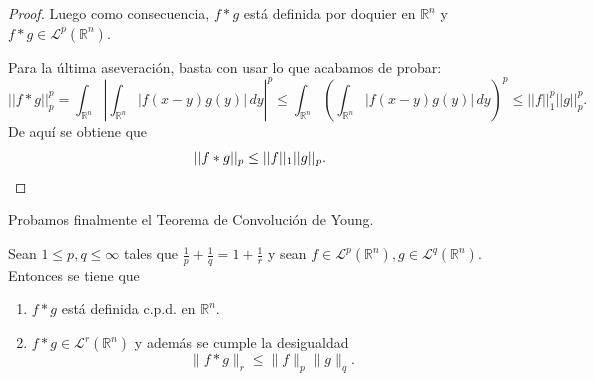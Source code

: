 \begin{proof}
\noindent Luego como consecuencia, $f*g$ está definida por doquier en $\mathbb{R}^n$ y  $f*g \in\mathscr{L}^p(\mathbb{R}^n) $.

\noindent Para la última aseveración, basta con usar lo que acabamos de probar:
\begin{equation}
    ||f*g||_{p}^{p} = \int_{\mathbb{R}^n}\left| \int_ {\mathbb{R}^n}|f(x-y)g(y)|\,dy\right|^p \leq  \int_{\mathbb{R}^n}\left( \int_ {\mathbb{R}^n}|f(x-y)g(y)|\,dy\right)^p \leq ||f||_{1}^p||g||_{p}^p.
\end{equation}
De aquí se obtiene que 
 \begin{equation*}
     ||f*g||_{p} \leq ||f||_1||g||_{p}. \qedhere
 \end{equation*}
\end{proof}

\noindent Probamos finalmente el Teorema de Convolución de Young.

\begin{teorema}
Sean $1\leq p, q \leq \infty$ tales que $\frac{1}{p}+\frac{1}{q}=1+\frac{1}{r}$ y sean $f\in \mathscr{L}^p(\mathbb{R}^n),g\in \mathscr{L}^q(\mathbb{R}^n) $. Entonces se tiene que 
\begin{enumerate}[itemsep=0.5ex,parsep=0pt,topsep=0pt,partopsep=0pt]
    \item $f*g$ está definida c.p.d. en $\mathbb{R}^n$.
    \item $f*g \in \mathscr{L}^r(\mathbb{R}^n)$ y además se cumple la desigualdad
    \begin{equation}
        \|f*g\|_r \leq \|f\|_p \|g\|_q.
    \end{equation}  
\end{enumerate}
\end{teorema}

